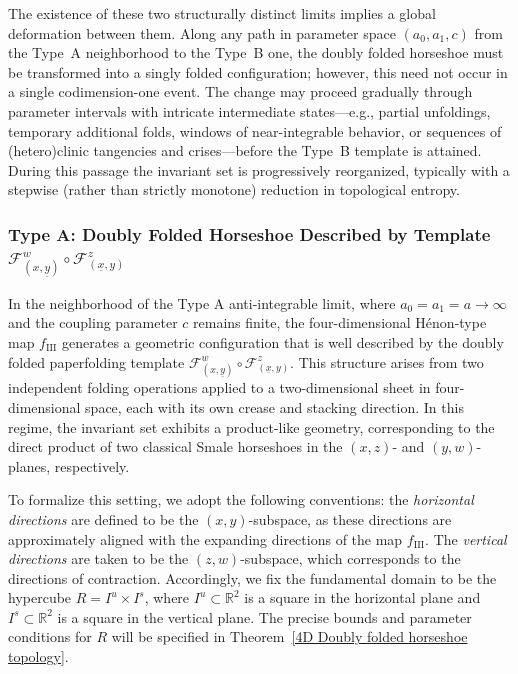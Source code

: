 \documentclass[12pt]{iopart}
\begin{document}
The existence of these two structurally distinct limits implies a global deformation between them. Along any path in parameter space \((a_0,a_1,c)\) from the Type~A neighborhood to the Type~B one, the doubly folded horseshoe must be transformed into a singly folded configuration; however, this need not occur in a single codimension-one event. The change may proceed gradually through parameter intervals with intricate intermediate states—e.g., partial unfoldings, temporary additional folds, windows of near-integrable behavior, or sequences of (hetero)clinic tangencies and crises—before the Type~B template is attained. During this passage the invariant set is progressively reorganized, typically with a stepwise (rather than strictly monotone) reduction in topological entropy.


  
    
\subsubsection{Type A: Doubly Folded Horseshoe Described by Template \( \mathcal{F}^w_{(x,\underline{y})} \circ \mathcal{F}^z_{(\underline{x},y)} \)}
\label{Type A}

In the neighborhood of the Type A anti-integrable limit, where \( a_0 = a_1 = a \to \infty \) and the coupling parameter \( c \) remains finite, the four-dimensional Hénon-type map \( f_{\mathrm{III}} \) generates a geometric configuration that is well described by the doubly folded paperfolding template \( \mathcal{F}^w_{(x,\underline{y})} \circ \mathcal{F}^z_{(\underline{x},y)} \). This structure arises from two independent folding operations applied to a two-dimensional sheet in four-dimensional space, each with its own crease and stacking direction. In this regime, the invariant set exhibits a product-like geometry, corresponding to the direct product of two classical Smale horseshoes in the \((x,z)\)- and \((y,w)\)-planes, respectively.

To formalize this setting, we adopt the following conventions: the \emph{horizontal directions} are defined to be the \( (x,y) \)-subspace, as these directions are approximately aligned with the expanding directions of the map \( f_{\mathrm{III}} \). The \emph{vertical directions} are taken to be the \( (z,w) \)-subspace, which corresponds to the directions of contraction. Accordingly, we fix the fundamental domain to be the hypercube \(R = I^u \times I^s\), where \( I^u \subset \mathbb{R}^2 \) is a square in the horizontal plane and \( I^s \subset \mathbb{R}^2 \) is a square in the vertical plane. The precise bounds and parameter conditions for \( R \) will be specified in Theorem~\ref{4D Doubly folded horseshoe topology}.
\end{document}
